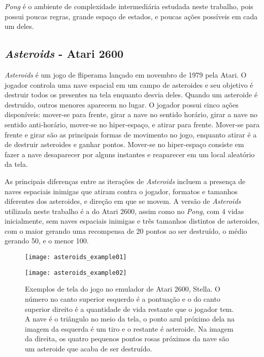\textit{Pong} é o ambiente de complexidade intermediária estudada neste trabalho, pois possui poucas regras, grande espaço de estados, e poucas ações possíveis em cada um deles.

\subsection{\textit{Asteroids} - Atari 2600}
\label{sec:asteroids}

\textit{Asteroids} é um jogo de fliperama
lançado em novembro de 1979 pela
Atari.
O jogador controla uma nave espacial em um campo de asteroides e seu objetivo é destruir todos os presentes na tela enquanto desvia deles.
Quando um asteroide é destruído, outros menores aparecem no lugar.
O jogador possui cinco ações disponíveis: mover-se para frente, girar a nave no sentido horário, girar a nave no sentido anti-horário, mover-se no hiper-espaço, e atirar para frente.
Mover-se para frente e girar são as principais formas de movimento no jogo, enquanto atirar é a de destruir asteroides e ganhar pontos.
Mover-se no hiper-espaço consiste em fazer a nave desaparecer por alguns instantes e reaparecer em um local aleatório da tela.

As principais diferenças entre as iterações de \textit{Asteroids} incluem a presença de naves espaciais inimigas que atiram contra o jogador, formatos e tamanhos diferentes dos asteroides, e direção em que se movem.
A versão de \textit{Asteroids} utilizada neste trabalho é a do Atari 2600, assim como no \textit{Pong}, com 4 vidas inicialmente, sem naves espaciais inimigas e três tamanhos distintos de asteroides, com o maior gerando uma recompensa de 20 pontos ao ser destruído, o médio gerando 50, e o menor 100.

\begin{figure}[h!]
  \begin{minipage}[b]{.5\textwidth}
  \centering
  \texttt{[image: asteroids\_example01]}
  \end{minipage}
  \hfill
  \begin{minipage}[b]{.5\textwidth}
  \texttt{[image: asteroids\_example02]}
  \end{minipage}
  \caption{Exemplos de tela do jogo no emulador de Atari 2600, Stella. O número no canto superior esquerdo é a pontuação e o do canto superior direito é a quantidade de vida restante que o jogador tem. A nave é o triângulo no meio da tela, o ponto azul próximo dela na imagem da esquerda é um tiro e o restante é asteroide. Na imagem da direita, os quatro pequenos pontos rosas próximos da nave são um asteroide que acaba de ser destruído.}
\end{figure}

